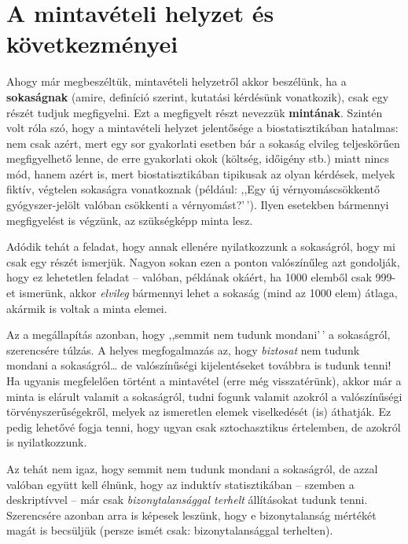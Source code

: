 \documentclass[
]{book}
\begin{document}
\hypertarget{induktivmintavetelihelyzet}{%
\section{A mintavételi helyzet és következményei}\label{induktivmintavetelihelyzet}}

Ahogy már megbeszéltük, mintavételi helyzetről akkor beszélünk, ha a \textbf{sokaságnak} (amire, definíció szerint, kutatási kérdésünk vonatkozik), csak egy részét tudjuk megfigyelni. Ezt a megfigyelt részt nevezzük \textbf{mintának}. Szintén volt róla szó, hogy a mintavételi helyzet jelentősége a biostatisztikában hatalmas: nem csak azért, mert egy sor gyakorlati esetben bár a sokaság elvileg teljeskörűen megfigyelhető lenne, de erre gyakorlati okok (költség, időigény stb.) miatt nincs mód, hanem azért is, mert biostatisztikában tipikusak az olyan kérdések, melyek fiktív, végtelen sokaságra vonatkoznak (például: ,,Egy új vérnyomáscsökkentő gyógyszer-jelölt valóban csökkenti a vérnyomást?'\,'). Ilyen esetekben bármennyi megfigyelést is végzünk, az szükségképp minta lesz.

Adódik tehát a feladat, hogy annak ellenére nyilatkozzunk a sokaságról, hogy mi csak egy részét ismerjük. Nagyon sokan ezen a ponton valószínűleg azt gondolják, hogy ez lehetetlen feladat -- valóban, példának okáért, ha 1000 elemből csak 999-et ismerünk, akkor \emph{elvileg} bármennyi lehet a sokaság (mind az 1000 elem) átlaga, akármik is voltak a minta elemei.

Az a megállapítás azonban, hogy ,,semmit nem tudunk mondani'\,' a sokaságról, szerencsére túlzás. A helyes megfogalmazás az, hogy \emph{biztosat} nem tudunk mondani a sokaságról\dots{} de valószínűségi kijelentéseket továbbra is tudunk tenni! Ha ugyanis megfelelően történt a mintavétel (erre még visszatérünk), akkor már a minta is elárult valamit a sokaságról, tudni fogunk valamit azokról a valószínűségi törvényszerűségekről, melyek az ismeretlen elemek viselkedését (is) áthatják. Ez pedig lehetővé fogja tenni, hogy ugyan csak sztochasztikus értelemben, de azokról is nyilatkozzunk.

Az tehát nem igaz, hogy semmit nem tudunk mondani a sokaságról, de azzal valóban együtt kell élnünk, hogy az induktív statisztikában -- szemben a deskriptívvel -- már csak \emph{bizonytalansággal terhelt} állításokat tudunk tenni. Szerencsére azonban arra is képesek leszünk, hogy e bizonytalanság mértékét magát is becsüljük (persze ismét csak: bizonytalansággal terhelten).
\end{document}
